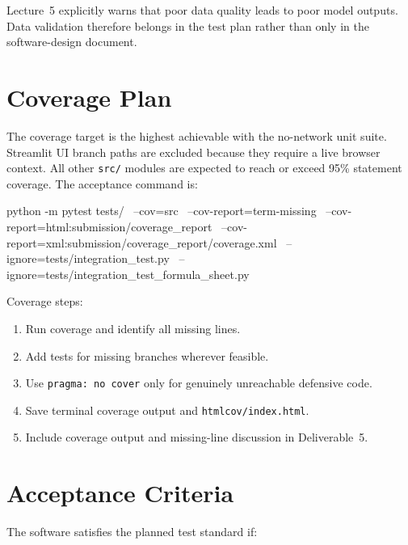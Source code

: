 \documentclass[11pt]{article}
\newcommand{\code}[1]{\texttt{#1}}
\begin{document}
Lecture~5 explicitly warns that poor data quality leads to poor model
outputs.  Data validation therefore belongs in the test plan rather
than only in the software-design document.

\section{Coverage Plan}

The coverage target is the highest achievable with the no-network unit
suite.  Streamlit UI branch paths are excluded because they require a
live browser context.  All other \code{src/} modules are expected to
reach or exceed 95\% statement coverage.  The acceptance command is:

\begin{shellcode}
python -m pytest tests/ \
  --cov=src \
  --cov-report=term-missing \
  --cov-report=html:submission/coverage_report \
  --cov-report=xml:submission/coverage_report/coverage.xml \
  --ignore=tests/integration_test.py \
  --ignore=tests/integration_test_formula_sheet.py
\end{shellcode}

Coverage steps:
\begin{enumerate}
  \item Run coverage and identify all missing lines.
  \item Add tests for missing branches wherever feasible.
  \item Use \code{pragma: no cover} only for genuinely unreachable
    defensive code.
  \item Save terminal coverage output and \code{htmlcov/index.html}.
  \item Include coverage output and missing-line discussion in Deliverable~5.
\end{enumerate}

\section{Acceptance Criteria}

The software satisfies the planned test standard if:
\end{document}
